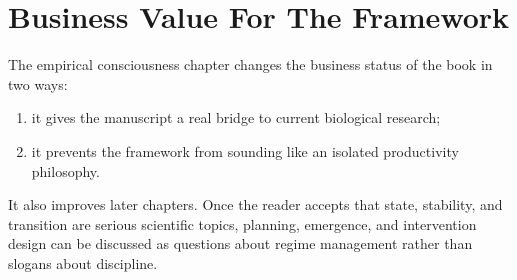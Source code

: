 \section{Business Value For The Framework}

The empirical consciousness chapter changes the business status of the book in
two ways:
\begin{enumerate}[nosep]
  \item it gives the manuscript a real bridge to current biological research;
  \item it prevents the framework from sounding like an isolated productivity
        philosophy.
\end{enumerate}

It also improves later chapters. Once the reader accepts that state,
stability, and transition are serious scientific topics, planning, emergence,
and intervention design can be discussed as questions about regime management
rather than slogans about discipline.
